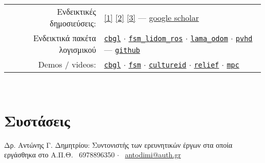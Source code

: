 \documentclass[a4paper,10pt,twoside]{article}
\begin{document}
\begin{tabular}{rp{12cm}}
  Ενδεικτικές δημοσιεύσεις: &
\href{https://ieeexplore.ieee.org/abstract/document/9981228}{[1]}
\href{https://www.sciencedirect.com/science/article/abs/pii/S0921889021002323}{[2]}
\href{https://www.tandfonline.com/doi/full/10.1080/00207179.2018.1514129}{[3]} --- \href{https://scholar.google.com/citations?view\_op=list\_works\&hl=en\&user=9\_hI4hMAAAAJ}{google scholar}\\

  Ενδεικτικά πακέτα λογισμικού&
\href{https://github.com/li9i/cbgl}{\texttt{cbgl}} $\cdot$
\href{https://github.com/li9i/fsm\_lidom\_ros}{\texttt{fsm\_lidom\_ros}} $\cdot$
\href{https://github.com/li9i/lama\_odom}{\texttt{lama\_odom}} $\cdot$
\href{https://github.com/li9i/pandora\_vision\_2014/tree/hydro-devel/pandora\_vision\_hole\_detector}{\texttt{pvhd}} --- \href{https://github.com/li9i}{\texttt{github}}\\

  Demos / videos: & \href{https://www.youtube.com/watch?v=xaDKjI0WkDc}{\texttt{cbgl}} $\cdot$ \href{https://www.youtube.com/watch?v=hB4qsHCEXGI}{\texttt{fsm}} $\cdot$ \href{https://cultureid.web.auth.gr/?page\_id=200&lang=en}{\texttt{cultureid}} $\cdot$ \href{https://relief.web.auth.gr/}{\texttt{relief}} $\cdot$ \href{https://www.youtube.com/watch?v=937OZez1iN8}{\texttt{mpc}}
\end{tabular}
\\

\section{Συστάσεις}
\noindent Δρ. Αντώνης Γ. Δημητρίου: Συντονιστής των ερευνητικών έργων στα οποία εργάσθηκα στο Α.Π.Θ. \hspace{1cm}
\faPhone \ 6978896350 $\cdot$ \faEnvelopeO \ \href{mailto:antodimi@auth.gr}{antodimi@auth.gr} \\




\end{document}
